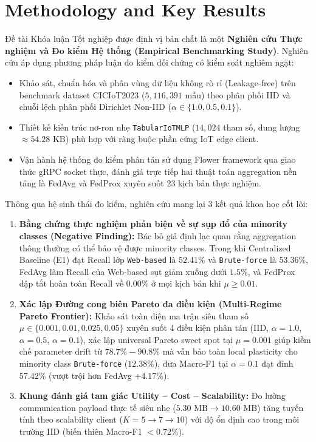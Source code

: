 \section{Methodology and Key Results}
\label{sec:intro_method_results}
Đề tài Khóa luận Tốt nghiệp được định vị bản chất là một \textbf{Nghiên cứu Thực nghiệm và Đo kiểm Hệ thống (Empirical Benchmarking Study)}. Nghiên cứu áp dụng phương pháp luận đo kiểm đối chứng có kiểm soát nghiêm ngặt:
\begin{itemize}
    \item Khảo sát, chuẩn hóa và phân vùng dữ liệu không rò rỉ (Leakage-free) trên benchmark dataset CICIoT2023 ($5,116,391$ mẫu) theo phân phối IID và chuỗi lệch phân phối Dirichlet Non-IID ($\alpha \in \{1.0, 0.5, 0.1\}$).
    \item Thiết kế kiến trúc nơ-ron nhẹ \texttt{TabularIoTMLP} ($14,024$ tham số, dung lượng $\approx 54.28\text{ KB}$) phù hợp với ràng buộc phần cứng IoT edge client.
    \item Vận hành hệ thống đo kiểm phân tán sử dụng Flower framework qua giao thức gRPC socket thực, đánh giá trực tiếp hai thuật toán aggregation nền tảng là FedAvg và FedProx xuyên suốt 23 kịch bản thực nghiệm.
\end{itemize}

Thông qua hệ sinh thái đo kiểm, nghiên cứu mang lại 3 kết quả khoa học cốt lõi:
\begin{enumerate}
    \item \textbf{Bằng chứng thực nghiệm phản biện về sự sụp đổ của minority classes (Negative Finding):} Bác bỏ giả định lạc quan rằng aggregation thông thường có thể bảo vệ được minority classes. Trong khi Centralized Baseline (E1) đạt Recall lớp \texttt{Web-based} là $52.41\%$ và \texttt{Brute-force} là $53.36\%$, FedAvg làm Recall của Web-based sụt giảm xuống dưới $1.5\%$, và FedProx dập tắt hoàn toàn Recall về $0.00\%$ ở mọi kịch bản khi $\mu \ge 0.01$.
    \item \textbf{Xác lập Đường cong biên Pareto đa điều kiện (Multi-Regime Pareto Frontier):} Khảo sát toàn diện ma trận siêu tham số $\mu \in \{0.001, 0.01, 0.025, 0.05\}$ xuyên suốt 4 điều kiện phân tán (IID, $\alpha=1.0$, $\alpha=0.5$, $\alpha=0.1$), xác lập universal Pareto sweet spot tại $\mu=0.001$ giúp kiềm chế parameter drift từ $78.7\% - 90.8\%$ mà vẫn bảo toàn local plasticity cho minority class \texttt{Brute-force} ($12.38\%$), đưa Macro-F1 tại $\alpha=0.1$ đạt đỉnh $57.42\%$ (vượt trội hơn FedAvg $+4.17\%$).
    \item \textbf{Khung đánh giá tam giác Utility -- Cost -- Scalability:} Đo lường communication payload thực tế siêu nhẹ ($5.30\text{ MB} \to 10.60\text{ MB}$) tăng tuyến tính theo scalability client ($K=5 \to 7 \to 10$) với độ ổn định cao trong môi trường IID (biến thiên Macro-F1 $<0.72\%$).
\end{enumerate}

